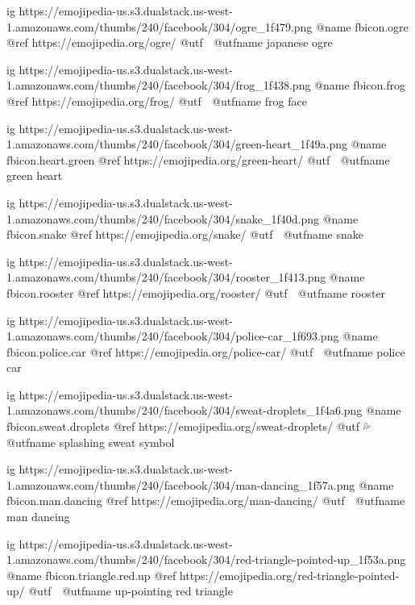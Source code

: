 	ig https://emojipedia-us.s3.dualstack.us-west-1.amazonaws.com/thumbs/240/facebook/304/ogre_1f479.png
	@name fbicon.ogre
	@ref https://emojipedia.org/ogre/
	@utf 👹
	@utfname japanese ogre

	ig https://emojipedia-us.s3.dualstack.us-west-1.amazonaws.com/thumbs/240/facebook/304/frog_1f438.png
	@name fbicon.frog
	@ref https://emojipedia.org/frog/
	@utf 🐸
	@utfname frog face

	ig https://emojipedia-us.s3.dualstack.us-west-1.amazonaws.com/thumbs/240/facebook/304/green-heart_1f49a.png
	@name fbicon.heart.green 
	@ref https://emojipedia.org/green-heart/
	@utf 💚
	@utfname green heart

	ig https://emojipedia-us.s3.dualstack.us-west-1.amazonaws.com/thumbs/240/facebook/304/snake_1f40d.png
	@name fbicon.snake
	@ref https://emojipedia.org/snake/
	@utf 🐍
	@utfname snake

	ig https://emojipedia-us.s3.dualstack.us-west-1.amazonaws.com/thumbs/240/facebook/304/rooster_1f413.png
	@name fbicon.rooster
	@ref https://emojipedia.org/rooster/
	@utf 🐓
	@utfname rooster

	ig https://emojipedia-us.s3.dualstack.us-west-1.amazonaws.com/thumbs/240/facebook/304/police-car_1f693.png
	@name fbicon.police.car
	@ref https://emojipedia.org/police-car/
	@utf 🚓
	@utfname police car

	ig https://emojipedia-us.s3.dualstack.us-west-1.amazonaws.com/thumbs/240/facebook/304/sweat-droplets_1f4a6.png
	@name fbicon.sweat.droplets
	@ref https://emojipedia.org/sweat-droplets/
	@utf 💦
	@utfname splashing sweat symbol

	ig https://emojipedia-us.s3.dualstack.us-west-1.amazonaws.com/thumbs/240/facebook/304/man-dancing_1f57a.png
	@name fbicon.man.dancing
	@ref https://emojipedia.org/man-dancing/
	@utf 🕺
	@utfname man dancing

	ig https://emojipedia-us.s3.dualstack.us-west-1.amazonaws.com/thumbs/240/facebook/304/red-triangle-pointed-up_1f53a.png
	@name fbicon.triangle.red.up
	@ref https://emojipedia.org/red-triangle-pointed-up/
	@utf 🔺
	@utfname up-pointing red triangle

\fi

